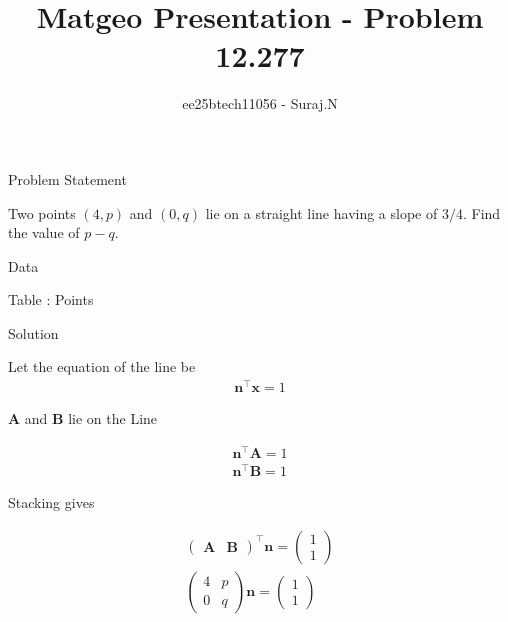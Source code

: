 \documentclass{beamer}
\title{Matgeo Presentation - Problem 12.277}
\author{ee25btech11056 - Suraj.N}
\numberwithin{equation}{section}
\theoremstyle{remark}
\newcommand{\myvec}[1]{\ensuremath{\begin{pmatrix}#1\end{pmatrix}}}
\let\vec\mathbf
\begin{document}
\begin{frame}
  \titlepage
\end{frame}

\begin{frame}{Problem Statement}

Two points \((4,p)\) and \((0,q)\) lie on a straight line having a slope of \(3/4\). Find the value of \(p-q\).

\end{frame}

\begin{frame}{Data}

\begin{table}[h!]
  \centering
  
  \caption*{Table : Points}
  \label{12.277}
\end{table}

\end{frame}

\begin{frame}{Solution}

Let the equation of the line be  
\begin{align}
\vec{n}^\top \vec{x} = 1
\end{align}


$\vec{A}$ and $\vec{B}$ lie on the Line

\begin{align}
  \vec{n}^\top\vec{A} = 1\\
  \vec{n}^\top\vec{B} = 1
\end{align}


Stacking gives 

\begin{align}
\myvec{\vec{A} & \vec{B}}^\top \vec{n} = \myvec{1\\1}\\
\myvec{4 & p\\0 & q}\vec{n} = \myvec{1\\1}
\end{align}

\end{frame}
\end{document}
